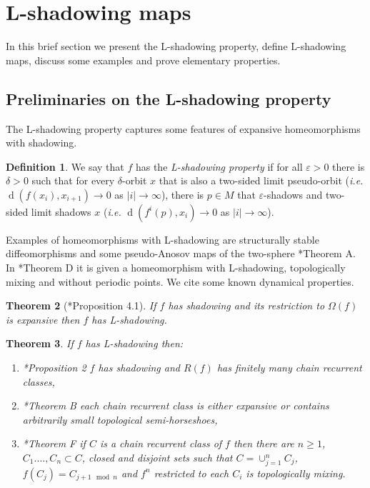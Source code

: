 \documentclass[12pt]{amsart}
\theoremstyle{plain}
\newtheorem{thm}{Theorem}[section]
\theoremstyle{definition}
\newtheorem{df}[thm]{Definition}
\theoremstyle{remark}
\DeclareMathOperator{\dist}{d}
\renewcommand{\epsilon}{\varepsilon}
\newcommand{\violeta}[1]{\textcolor{magenta}{#1}}
\begin{document}
\section{L-shadowing maps}
\label{L-shadowing maps}
In this brief section we present the L-shadowing property, define L-shadowing maps, discuss some examples and prove elementary properties.
\subsection{Preliminaries on the L-shadowing property}
The L-shadowing property captures some features of expansive homeomorphisms with shadowing.
\begin{df} We say that $f$ has the \textit{L-shadowing property}
	if for all $\epsilon>0$ there is $\delta>0$ such that
	for every $\delta$-orbit $x$ that is also a two-sided limit pseudo-orbit (\textit{i.e.} $\dist(f(x_i),x_{i+1})\to 0$ as $|i|\to\infty$), there is $p\in M$ that $\epsilon$-shadows and two-sided limit shadows $x$ (\textit{i.e.} $\dist(f^i(p),x_i)\to 0$ as $|i|\to\infty$).
\end{df}

Examples of homeomorphisms with L-shadowing are structurally stable diffeomorphisms and some pseudo-Anosov maps of the two-sphere \cite{ACCV20}*{Theorem A}.
In \cite{ACCV20}*{Theorem D} it is given a homeomorphism with L-shadowing, topologically mixing and without periodic points.
We cite some known dynamical properties.

\begin{thm}[\cite{ACCV20}*{Proposition 4.1}]
	If $f$ has shadowing and its restriction to $\Omega(f)$ is expansive then $f$ has L-shadowing.
\end{thm}

\begin{thm}
	If $f$ has L-shadowing then:
	\begin{enumerate}
		\item \cite{CaCo19}*{Proposition 2} $f$ has shadowing and $R(f)$ has finitely many chain recurrent classes,
		\item \cite{ACCV20}*{Theorem B} each chain recurrent class is either expansive or contains arbitrarily small topological semi-horseshoes,
		\item \cite{ACCV20}*{Theorem F} if $C$ is a chain recurrent class of $f$ then there are $n\geq 1$, $C_1.\dots,C_n\subset C$, closed and  disjoint sets such that $C=\cup_{j=1}^n C_j$, $f(C_j)=C_{j+1\mod n}$ and $f^n$ restricted to each $C_i$ is topologically mixing.
	\end{enumerate}
\end{thm}
\end{document}
